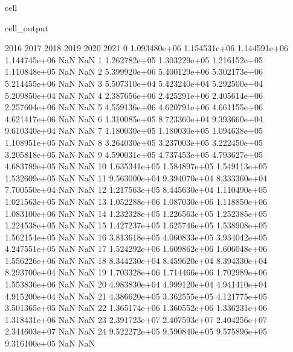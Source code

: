 \documentclass[letterpaper,10pt,english]{jupyterBook}
\begin{document}
\begin{sphinxuseclass}{cell}
\begin{sphinxVerbatimOutput}
\begin{sphinxuseclass}{cell_output}
\begin{sphinxVerbatim}[commandchars=\\\{\}]
            2016          2017          2018          2019  2020  2021  \PYGZbs{}
0   1.093480e+06  1.154531e+06  1.144591e+06  1.144745e+06   NaN   NaN   
1   1.262782e+05  1.303229e+05  1.216152e+05  1.110848e+05   NaN   NaN   
2   5.399920e+06  5.400129e+06  5.302173e+06  5.214455e+06   NaN   NaN   
3   5.507310e+04  5.423240e+04  5.292500e+04  5.209850e+04   NaN   NaN   
4   2.387656e+06  2.425291e+06  2.405614e+06  2.257604e+06   NaN   NaN   
5   4.559136e+06  4.620791e+06  4.661155e+06  4.621417e+06   NaN   NaN   
6   1.310085e+05  8.723360e+04  9.393660e+04  9.610340e+04   NaN   NaN   
7   1.180030e+05  1.180030e+05  1.094638e+05  1.108951e+05   NaN   NaN   
8   3.264030e+05  3.237003e+05  3.222450e+05  3.205818e+05   NaN   NaN   
9   4.590031e+05  4.737453e+05  4.793627e+05  4.683789e+05   NaN   NaN   
10  1.635341e+05  1.584897e+05  1.549113e+05  1.532609e+05   NaN   NaN   
11  9.563000e+04  9.394070e+04  8.333360e+04  7.700550e+04   NaN   NaN   
12  1.217563e+05  8.445630e+04  1.110490e+05  1.021563e+05   NaN   NaN   
13  1.052288e+06  1.087030e+06  1.118850e+06  1.083100e+06   NaN   NaN   
14  1.232328e+05  1.226563e+05  1.252385e+05  1.224538e+05   NaN   NaN   
15  1.427237e+05  1.625746e+05  1.538908e+05  1.562154e+05   NaN   NaN   
16  3.813618e+05  4.060833e+05  3.934042e+05  4.247551e+05   NaN   NaN   
17  1.524292e+06  1.609862e+06  1.606048e+06  1.556226e+06   NaN   NaN   
18  8.344230e+04  8.459620e+04  8.394330e+04  8.293700e+04   NaN   NaN   
19  1.703328e+06  1.714466e+06  1.702989e+06  1.553836e+06   NaN   NaN   
20  4.983830e+04  4.999120e+04  4.941410e+04  4.915200e+04   NaN   NaN   
21  4.386620e+05  3.362555e+05  4.121775e+05  3.501365e+05   NaN   NaN   
22  1.365174e+06  1.360552e+06  1.336231e+06  1.318431e+06   NaN   NaN   
23  2.391723e+07  2.407593e+07  2.404256e+07  2.344603e+07   NaN   NaN   
24  9.522272e+05  9.590840e+05  9.575896e+05  9.316100e+05   NaN   NaN   


\end{sphinxVerbatim}
\end{sphinxuseclass}
\end{sphinxVerbatimOutput}
\end{sphinxuseclass}
\end{document}
